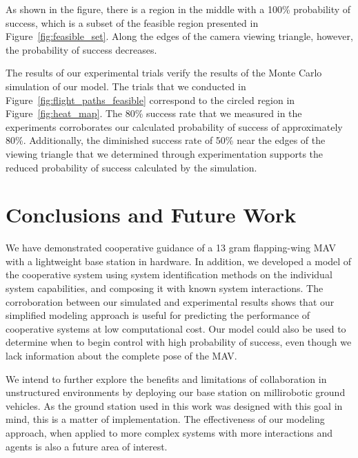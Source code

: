 \documentclass{aamas2013}
\begin{document}
As shown in the figure, there is a region in the middle with a 100\% 
probability of success, which is a subset of the feasible region presented 
in Figure~\ref{fig:feasible_set}. Along the edges of the camera viewing 
triangle, however, the probability of success decreases.

The results of our experimental trials verify the results of the Monte Carlo
simulation of our model. The trials that we conducted in
Figure~\ref{fig:flight_paths_feasible} correspond to the circled region in
Figure~\ref{fig:heat_map}. The 80\% success rate that we measured in the
experiments corroborates our calculated probability of success of
approximately 80\%. Additionally, the diminished success rate of 50\% near the
edges of the viewing triangle that we determined through experimentation
supports the reduced probability of success calculated by the simulation.

\section{Conclusions and Future Work}
We have demonstrated cooperative guidance of a 13 gram flapping-wing MAV with a
lightweight base station in hardware. In addition, we developed a model of the
cooperative system using system identification methods on the individual system capabilities, and composing
it with known system interactions. The corroboration between our simulated and
experimental results shows that our simplified modeling approach is useful for 
predicting the performance of cooperative systems at low computational cost. Our model could also be used to determine when to begin control with high probability of success, even though we lack information about the complete pose of the MAV.

We intend to further explore the benefits and limitations of collaboration in
unstructured environments by deploying our base station on millirobotic ground
vehicles. As the ground station used in this work was designed with this goal
in mind, this is a matter of implementation. The effectiveness of our modeling
approach, when applied to more complex systems with more interactions and 
agents is also a future area of interest. 

\end{document}
